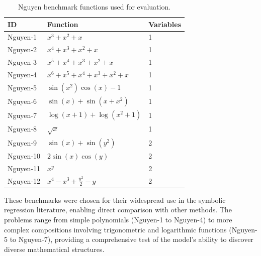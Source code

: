 \begin{table}[h!]
    \centering
    \caption{Nguyen benchmark functions used for evaluation.}
    \label{tab:nguyen_benchmarks}
    \begin{tabular}{lll}
    \toprule
    \textbf{ID} & \textbf{Function} & \textbf{Variables} \\
    \midrule
    Nguyen-1 & $x^3 + x^2 + x$ & 1 \\
    Nguyen-2 & $x^4 + x^3 + x^2 + x$ & 1 \\
    Nguyen-3 & $x^5 + x^4 + x^3 + x^2 + x$ & 1 \\
    Nguyen-4 & $x^6 + x^5 + x^4 + x^3 + x^2 + x$ & 1 \\
    Nguyen-5 & $\sin(x^2) \cos(x) - 1$ & 1 \\
    Nguyen-6 & $\sin(x) + \sin(x + x^2)$ & 1 \\
    Nguyen-7 & $\log(x + 1) + \log(x^2 + 1)$ & 1 \\
    Nguyen-8 & $\sqrt{x}$ & 1 \\
    Nguyen-9 & $\sin(x) + \sin(y^2)$ & 2 \\
    Nguyen-10 & $2\sin(x)\cos(y)$ & 2 \\
    Nguyen-11 & $x^y$ & 2 \\
    Nguyen-12 & $x^4 - x^3 + \frac{y^2}{2} - y$ & 2 \\
    \bottomrule
    \end{tabular}
\end{table}

    These benchmarks were chosen for their widespread use in the symbolic regression literature, enabling direct comparison with other methods. The problems range from simple polynomials (Nguyen-1 to Nguyen-4) to more complex compositions involving trigonometric and logarithmic functions (Nguyen-5 to Nguyen-7), providing a comprehensive test of the model's ability to discover diverse mathematical structures.
            
        

